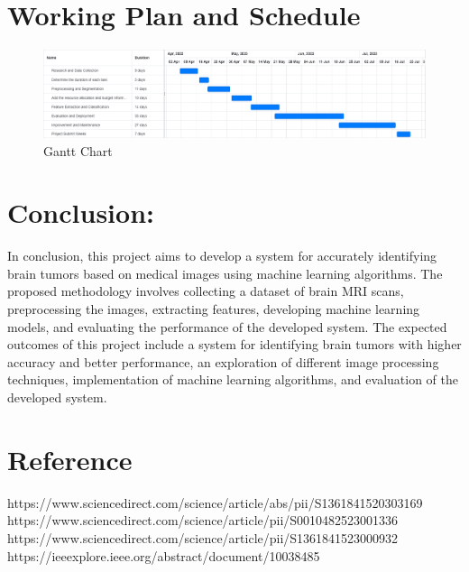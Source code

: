 \documentclass{article}
\begin{document}
\section{Working Plan and Schedule}
\begin{figure}[h]
    \centering
    \includegraphics[width=15cm]{img/plan.png}
    \caption{Gantt Chart}
    \label{fig:enter-label}
\end{figure}




\section{Conclusion:}
In conclusion, this project aims to develop a system for accurately identifying brain tumors based on medical images using machine learning algorithms. The proposed methodology involves collecting a dataset of brain MRI scans, preprocessing the images, extracting features, developing machine learning models, and evaluating the performance of the developed system. The expected outcomes of this project include a system for identifying brain tumors with higher accuracy and better performance, an exploration of different image processing techniques, implementation of machine learning algorithms, and evaluation of the developed system.
\section{Reference}

https://www.sciencedirect.com/science/article/abs/pii/S1361841520303169\\
https://www.sciencedirect.com/science/article/pii/S0010482523001336 \\
https://www.sciencedirect.com/science/article/pii/S1361841523000932\\
https://ieeexplore.ieee.org/abstract/document/10038485
\end{document}
